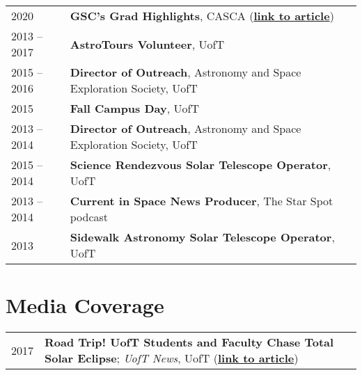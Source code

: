 \documentclass[10pt]{res} %
\begin{document}
\begin{resume}
\begin{table}[h!]
\begin{tabularx}{\textwidth}{lX}
2020 & \textbf{GSC's Grad Highlights}, CASCA (\href{https://casca.ca/?page_id=14667}{\textbf{link to article}}) \\
2013 -- 2017 & \textbf{AstroTours Volunteer}, UofT \\
2015 -- 2016 & \textbf{Director of Outreach}, Astronomy and Space Exploration Society, UofT \\
2015 & \textbf{Fall Campus Day}, UofT \\
2013 -- 2014 & \textbf{Director of Outreach}, Astronomy and Space Exploration Society, UofT \\
2015 -- 2014 & \textbf{Science Rendezvous Solar Telescope Operator}, UofT \\
2013 -- 2014 & \textbf{Current in Space News Producer}, The Star Spot podcast \\
2013 & \textbf{Sidewalk Astronomy Solar Telescope Operator}, UofT
\end{tabularx}
\end{table}


\section{\Large Media Coverage}
\vspace{-5pt} %
\noindent\makebox[\linewidth]{\rule{\textwidth}{0.4pt}}
\vspace{-20pt} %

\begin{table}[h!]
\begin{tabularx}{\textwidth}{lX}
2017 & \textbf{Road Trip! UofT Students and Faculty Chase Total Solar Eclipse}; \textit{UofT News}, UofT (\href{https://www.utoronto.ca/news/road-trip-u-t-students-and-faculty-chase-total-solar-eclipse}{\textbf{link to article}})
\end{tabularx}
\end{table}



\end{resume} 
\end{document}
